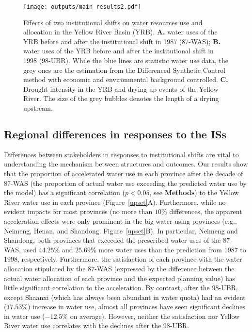 \begin{figure*}[!h]
    \centering
    \texttt{[image: outputs/main\_results2.pdf]}
    \caption{
        Effects of two institutional shifts on water resources use and allocation in the Yellow River Basin (YRB).
        \textbf{A.} water uses of the YRB before and after the institutional shift in 1987 (87-WAS);
        \textbf{B.} water uses of the YRB before and after the institutional shift in 1998 (98-UBR). While the blue lines are statistic water use data, the grey ones are the estimation from the Differenced Synthetic Control method with economic and environmental background controlled.
        \textbf{C.} Drought intensity in the YRB and drying up events of the Yellow River. The size of the grey bubbles denotes the length of a drying upstream.
    }
    \label{main_results}
\end{figure*}


\subsection{Regional differences in responses to the ISs}
\label{result-3}

Differences between stakeholders in responses to institutional shifts are vital to understanding the mechanism between structures and outcomes.
Our results show that the proportion of accelerated water use in each province after the decade of 87-WAS (the proportion of actual water use exceeding the predicted water use by the model) has a significant correlation ($p<0.05$, see \textbf{Methods}) to the Yellow River water use in each province (Figure~\ref{upset}A).
Furthermore, while no evident impacts for most provinces (no more than $10\%$ differences, the apparent acceleration effects were only prominent in the big water-using provinces (e.g., Neimeng, Henan, and Shandong. Figure~\ref{upset}B).
In particular, Neimeng and Shandong, both provinces that exceeded the prescribed water uses of the 87-WAS, used $44.25\%$ and $25.69\%$ more water uses than the prediction from 1987 to 1998, respectively.
Furthermore, the satisfaction of each province with the water allocation stipulated by the 87-WAS (expressed by the difference between the actual water allocation of each province and the expected planning value) has little significant correlation to the acceleration.
By contrast, after the 98-UBR, except Shaanxi (which has always been abundant in water quota) had an evident ($17.53\%$) increase in water use, almost all provinces have seen significant declines in water use ($-12.5\%$ on average).
However, neither the satisfaction nor Yellow River water use correlates with the declines after the 98-UBR.

